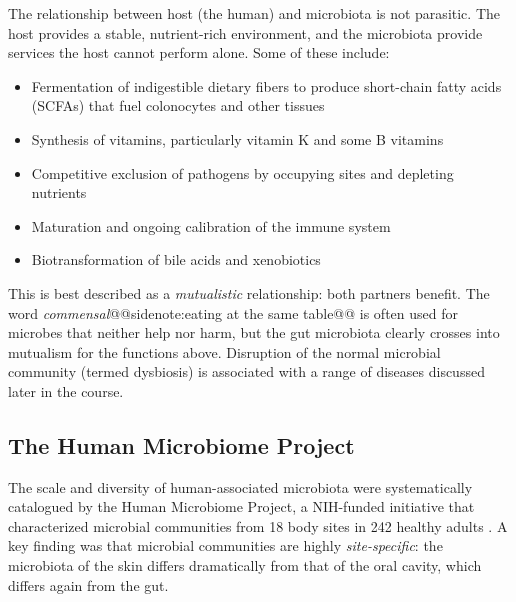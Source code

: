 \documentclass{tufte-handout}
\makeatletter
\def\sidenote#1{@@sidenote:#1@@}
\makeatother
\begin{document}
The relationship between host (the human) and microbiota is not parasitic. The host provides a stable, nutrient-rich environment, and the microbiota provide services the host cannot perform alone. Some of these include:

\begin{itemize}
  \item Fermentation of indigestible dietary fibers to produce short-chain fatty acids (SCFAs) that fuel colonocytes and other tissues
  \item Synthesis of vitamins, particularly vitamin K and some B vitamins 
  \item Competitive exclusion of pathogens by occupying sites and depleting nutrients
  \item Maturation and ongoing calibration of the immune system
  \item Biotransformation of bile acids and xenobiotics
\end{itemize}

This is best described as a \textit{mutualistic} relationship: both partners benefit. The word \textit{commensal}\sidenote{eating at the same table} is often used for microbes that neither help nor harm, but the gut microbiota clearly crosses into mutualism for the functions above. Disruption of the normal microbial community (termed dysbiosis) is associated with a range of diseases discussed later in the course.

\subsection{The Human Microbiome Project}

The scale and diversity of human-associated microbiota were systematically catalogued by the Human Microbiome Project, a NIH-funded initiative that characterized microbial communities from 18 body sites in 242 healthy adults \citep{humanmicrobiomeprojectconsortiumStructureFunctionHuman2012}. A key finding was that microbial communities are highly \textit{site-specific}: the microbiota of the skin differs dramatically from that of the oral cavity, which differs again from the gut. 

\end{document}
